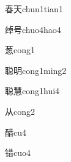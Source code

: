 \begin{verbete}[9;4]{春天}{chun1tian1}
\end{verbete}

\begin{verbete}[11;5]{绰号}{chuo4hao4}
\end{verbete}

\begin{verbete}[12]{葱}{cong1}
\end{verbete}

\begin{verbete}[15;8]{聪明}{cong1ming2}
\end{verbete}

\begin{verbete}[15;15]{聪慧}{cong1hui4}
\end{verbete}

\begin{verbete}[4]{从}{cong2}
\end{verbete}

\begin{verbete}[15]{醋}{cu4}
\end{verbete}

\begin{verbete}[13]{错}{cuo4}
\end{verbete}


